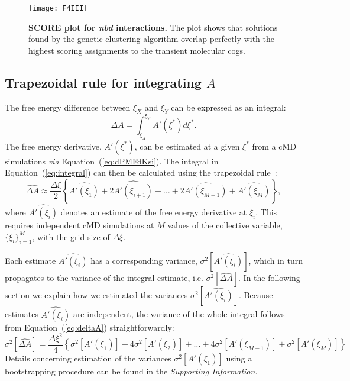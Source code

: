 \documentclass[a4paper,11pt,twoside]{book}%
\begin{document}
\begin{figure}[h!]
 \centering
\texttt{[image: F4III]}
\caption{
{\bf SCORE plot for \emph{nbd} interactions.}
The plot shows that solutions found by the genetic clustering algorithm overlap perfectly with the highest scoring assignments to the transient molecular cogs.
}
\label{fig:scoring}
\end{figure}

\subsection{Trapezoidal rule for integrating $A$}
The free energy difference between $\xi_X$ and $\xi_Y$ can be expressed as an integral:
\begin{equation}\label{eq:integral}
 \Delta A = \int_{\xi_X}^{\xi_Y}A'(\xi^*)d\xi^*.
\end{equation}
The free energy derivative, $A'(\xi^*)$, can be estimated at a given $\xi^*$ from a cMD simulations \emph{via} Equation~(\ref{eq:dPMFdKsi}).
The integral in Equation~(\ref{eq:integral}) can then be calculated using the trapezoidal rule~\cite{press2007numerical}:
\begin{equation}\label{eq:deltaA}
\widehat{\Delta A} \approx \frac{\Delta\xi}{2}\left\{ \widehat{A'(\xi_1)} + 2\widehat{A'(\xi_{i+1})}+\ldots+2\widehat{A'(\xi_{M-1})}+\widehat{A'(\xi_M)} \right\},
\end{equation}
where $\widehat{A'(\xi_i)}$ denotes an estimate of the free energy derivative at $\xi_i$.
This requires independent cMD simulations at $M$ values of the collective variable, $\{ \xi_i\}_{i=1}^M$, with the grid size of $\Delta\xi$.

Each estimate $\widehat{A'(\xi_i)}$ has a corresponding variance, $\sigma^2[\widehat{A'(\xi_i)}]$, which in turn propagates to the variance of the integral estimate, i.e. $\sigma^2[\widehat{\Delta A}]$.
In the following section we explain how we estimated the variances $\sigma^2[\widehat{A'(\xi_i)}]$.
Because estimates $\widehat{A'(\xi_i)}$ are independent, the variance of the whole integral follows from Equation~(\ref{eq:deltaA}) straightforwardly:
\begin{equation}\label{eq:varDeltaA}
 \sigma^2[\widehat{\Delta A}] = \frac{\Delta\xi^2}{4}\left\{ \sigma^2[A'(\xi_1)] + 4\sigma^2[A'(\xi_2)]+\ldots+4\sigma^2[A'(\xi_{M-1})]+\sigma^2[A'(\xi_M)] \right\}
\end{equation}
{\color{black}Details concerning estimation of the variances $\sigma^2[A'(\xi_1)]$ using a bootstrapping procedure can be found in the \emph{Supporting Information}.}
\end{document}
